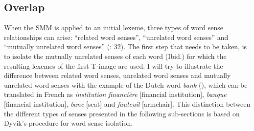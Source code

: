 \subsection{\label{sec:3.4.3}  Overlap}

When the SMM is applied to an initial lexeme, three types of word sense relationships can arise: “related word senses”, “unrelated word senses” and “mutually unrelated word senses” (\citealt{langemets_translations_2005}: 32). The first step that needs to be taken, is to isolate the mutually unrelated senses of each word (Ibid.) for which the resulting lexemes of the first T-image are used. I will try to illustrate the difference between related word senses, unrelated word senses and mutually unrelated word senses with the example of the Dutch word \textit{bank} (), which can be translated in French as \textit{institution} \textit{financière} [financial institution], \textit{banque} [financial institution], \textit{banc} [seat] and \textit{fauteuil} [armchair]. This distinction between the different types of senses presented in the following sub-sections is based on Dyvik’s procedure for word sense isolation.


